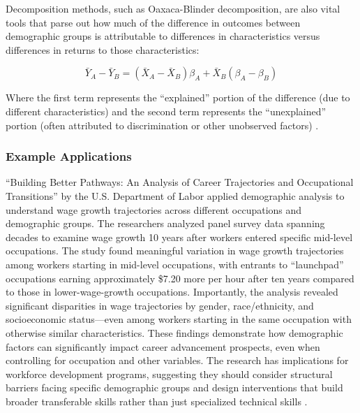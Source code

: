 \documentclass[../main.tex]{subfiles}
\begin{document}
 Decomposition methods, such as Oaxaca-Blinder decomposition, are also vital tools that parse out how much of the difference in outcomes between demographic groups is attributable to differences in characteristics versus differences in returns to those characteristics:

\begin{equation}
\bar{Y}_A - \bar{Y}_B = (\bar{X}_A - \bar{X}_B)\beta_A + \bar{X}_B(\beta_A - \beta_B)
\end{equation}

Where the first term represents the ``explained'' portion of the difference (due to different characteristics) and the second term represents the ``unexplained'' portion (often attributed to discrimination or other unobserved factors) \citep{dol2023building, baker2023demographic}.

\subsubsection{Example Applications}

 ``Building Better Pathways: An Analysis of Career Trajectories and Occupational Transitions'' by the U.S. Department of Labor applied demographic analysis to understand wage growth trajectories across different occupations and demographic groups. The researchers analyzed panel survey data spanning decades to examine wage growth 10 years after workers entered specific mid-level occupations. The study found meaningful variation in wage growth trajectories among workers starting in mid-level occupations, with entrants to ``launchpad'' occupations earning approximately \$7.20 more per hour after ten years compared to those in lower-wage-growth occupations. Importantly, the analysis revealed significant disparities in wage trajectories by gender, race/ethnicity, and socioeconomic status—even among workers starting in the same occupation with otherwise similar characteristics. These findings demonstrate how demographic factors can significantly impact career advancement prospects, even when controlling for occupation and other variables. The research has implications for workforce development programs, suggesting they should consider structural barriers facing specific demographic groups and design interventions that build broader transferable skills rather than just specialized technical skills \citep{dol2023building}.
\end{document}

